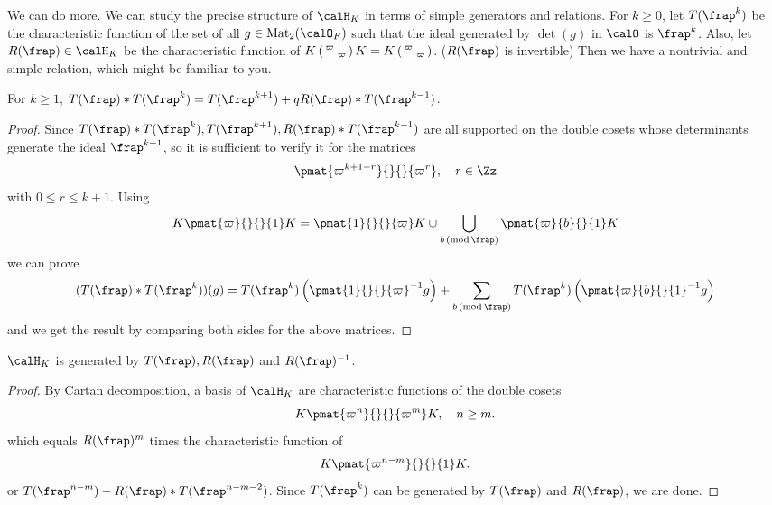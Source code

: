 We can do more. We can study the precise structure of $\calH_K$ in terms of simple generators and relations. 
For $k\geq 0$, let $T(\frap^{k})$ be the characteristic function of the set of all $g\in \mathrm{Mat}_{2}(\calO_F)$ such that the ideal generated by $\det(g)$ in $\calO$ is $\frap^k$. 
Also, let $R(\frap)\in \calH_K$ be the characteristic function of $K \left(\begin{smallmatrix} \varpi &  \\  & \varpi \end{smallmatrix}\right) K = K\left(\begin{smallmatrix} \varpi &  \\  & \varpi \end{smallmatrix}\right)$. ($R(\frap)$ is invertible)
Then we have a nontrivial and simple relation, which might be familiar to you. 
\begin{proposition}
\label{heckerel}
For $k\geq 1$, $T(\frap)*T(\frap^k) = T(\frap^{k+1}) + qR(\frap)*T(\frap^{k-1})$. 
\end{proposition}
\begin{proof}
Since $T(\frap)*T(\frap^k), T(\frap^{k+1}), R(\frap)*T(\frap^{k-1})$ are all supported on the double cosets whose determinants generate the ideal $\frap^{k+1}$, so it is sufficient to verify it for the matrices 
$$
\pmat{\varpi^{k+1-r}}{}{}{\varpi^{r}}, \quad r\in \Zz
$$
with $0\leq r\leq k+1$. Using
$$
K \pmat{\varpi}{}{}{1}K = \pmat{1}{}{}{\varpi}K \cup \bigcup_{b\Mod{\frap}} \pmat{\varpi}{b}{}{1} K
$$
we can prove
$$
(T(\frap) * T(\frap^{k}))(g) = T(\frap^{k}) \left( \pmat{1}{}{}{\varpi}^{-1}g\right) + \sum_{b\Mod{\frap}} T(\frap^{k}) \left( \pmat{\varpi}{b}{}{1}^{-1} g\right)
$$
and we get the result by comparing both sides for the above matrices. 
\end{proof}
\begin{proposition}
\label{heckegen}
$\calH_K$ is generated by $T(\frap), R(\frap)$ and $R(\frap)^{-1}$. 
\end{proposition}
\begin{proof}
By Cartan decomposition, a basis of $\calH_K$ are characteristic functions of the double cosets
$$
K\pmat{\varpi^n}{}{}{\varpi^m} K, \quad n\geq m. 
$$
which equals $R(\frap)^m$ times the characteristic function of
$$
K\pmat{\varpi^{n-m}}{}{}{1} K. 
$$
or $T(\frap^{n-m}) - R(\frap)*T(\frap^{n-m-2})$. Since $T(\frap^{k})$ can be generated by $T(\frap)$ and $R(\frap)$, we are done. 
\end{proof}

